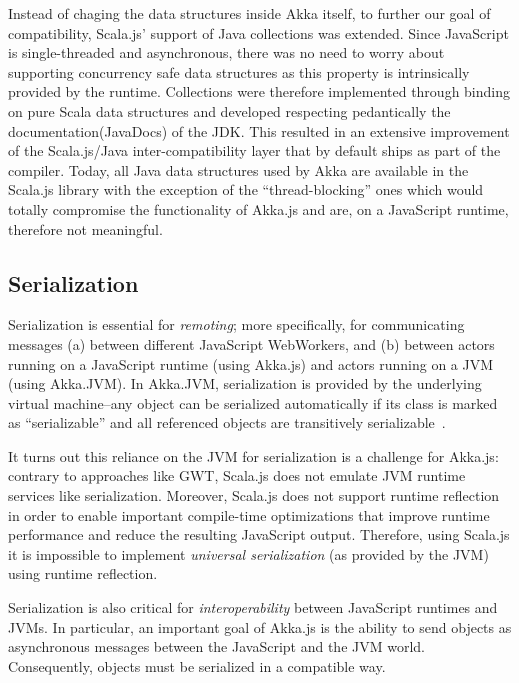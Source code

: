 \documentclass{sig-alternate}
\begin{document}
Instead of chaging the data structures inside Akka itself, to further our goal of compatibility, Scala.js' support of Java collections was extended.
Since JavaScript is single-threaded and asynchronous, there was no need to worry about supporting concurrency safe data structures as this property is intrinsically provided by the runtime.
Collections were therefore implemented through binding on pure Scala data structures and developed respecting pedantically the documentation(JavaDocs) of the JDK.
This resulted in an extensive improvement of the Scala.js/Java inter-compatibility layer that by default ships as part of the compiler.
Today, all Java data structures used by Akka are available in the Scala.js library with the exception of the ``thread-blocking'' ones which would totally compromise the functionality of Akka.js and are, on a JavaScript runtime, therefore not meaningful.


\subsection{Serialization}\label{sec:serialization}

Serialization is essential for {\em remoting}; more specifically, for
communicating messages (a) between different
JavaScript WebWorkers, and (b) between actors running on a JavaScript
runtime (using Akka.js) and actors running on a JVM (using Akka.JVM).
In Akka.JVM, serialization is provided by the underlying virtual
machine--any object can be serialized automatically if its class is
marked as ``serializable'' and all referenced objects are
transitively serializable~\cite{Philippsen2000,Maassen1999}.

It turns out this reliance on the JVM for serialization is a challenge for
Akka.js: contrary to approaches like GWT, Scala.js does not emulate JVM
runtime services like serialization. Moreover, Scala.js does not support
runtime reflection in order to enable important compile-time optimizations
that improve runtime performance and reduce the resulting JavaScript output. Therefore,
using Scala.js it is impossible to implement {\em universal serialization} (as
provided by the JVM) using runtime reflection.

Serialization is also critical for {\em interoperability} between JavaScript
runtimes and JVMs. In particular, an important goal of Akka.js is the
ability to send objects as asynchronous messages between the JavaScript
and the JVM world. Consequently, objects must be serialized in a compatible
way.
\end{document}
